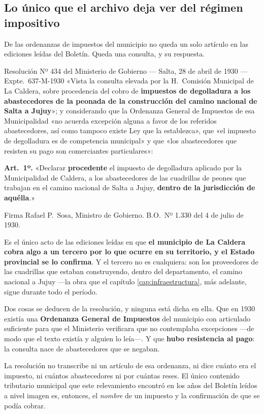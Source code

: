 \subsection*{Lo único que el archivo deja ver del régimen impositivo}

De las ordenanzas de impuestos del municipio no queda un solo artículo en las ediciones leídas del Boletín. Queda
una consulta, y su respuesta.

\begin{ficha}{Resolución Nº 434 del Ministerio de Gobierno --- Salta, 28 de abril de 1930 --- Expte.\ 637-M-1930}
«Vista la consulta elevada por la H.\ Comisión Municipal de La Caldera, sobre procedencia del
cobro de \textbf{impuestos de degolladura a los abastecedores de la peonada de la construcción
del camino nacional de Salta a Jujuy}»; y considerando que la Ordenanza General de Impuestos de
esa Municipalidad «no acuerda excepción alguna a favor de los referidos abastecedores, así como
tampoco existe Ley que la establezca», que «el impuesto de degolladura es de competencia
municipal» y que «los abastecedores que resisten su pago son comerciantes particulares»:

\textbf{Art.\ 1º.} «Declarar \textbf{procedente} el impuesto de degolladura aplicado por la
Municipalidad de Caldera, a los abastecedores de las cuadrillas de peones que trabajan en el
camino nacional de Salta a Jujuy, \textbf{dentro de la jurisdicción de aquélla}.»

Firma Rafael P.\ Sosa, Ministro de Gobierno. B.O.\ Nº 1.330 del 4 de julio de 1930.
\end{ficha}

Es el único acto de las ediciones leídas en que \textbf{el municipio de La Caldera cobra algo a un tercero
por lo que ocurre en su territorio, y el Estado provincial se lo confirma}. Y el tercero no es
cualquiera: son los proveedores de las cuadrillas que estaban construyendo, dentro del
departamento, el camino nacional a Jujuy ---la obra que el capítulo \ref{cap:infraestructura}, más adelante,
sigue durante todo el período.

Dos cosas se deducen de la resolución, y ninguna está dicha en ella. Que en 1930 existía una
\textbf{Ordenanza General de Impuestos} del municipio con articulado suficiente para que el
Ministerio verificara que no contemplaba excepciones ---de modo que el texto existía y alguien
lo leía---. Y que \textbf{hubo resistencia al pago}: la consulta nace de abastecedores que se
negaban.

\begin{cautela}
La resolución no transcribe ni un artículo de esa ordenanza, ni dice cuánto era el impuesto, ni
cuántos abastecedores ni por cuántas reses. El único contenido tributario municipal que este
relevamiento encontró en los años del Boletín leídos a nivel imagen es, entonces, el \textit{nombre} de un
impuesto y la confirmación de que se podía cobrar.
\end{cautela}

